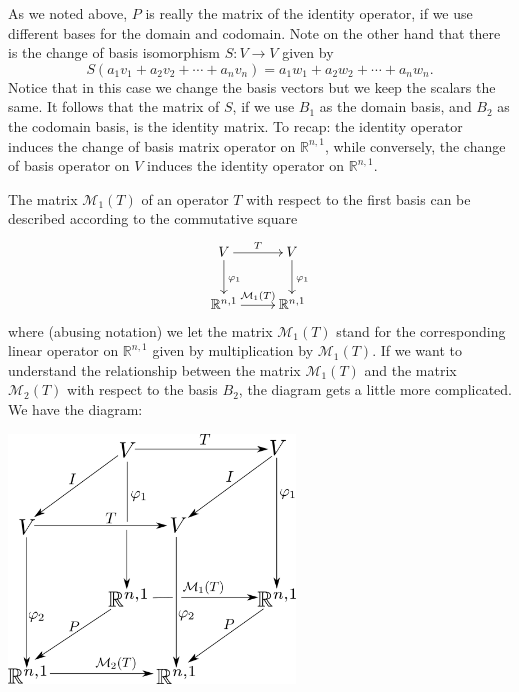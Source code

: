 \documentclass[12pt,letterpaper]{article}
\newcommand{\M}{\mathcal{M}}
\newcommand{\R}{\mathbb{R}}
\begin{document}
As we noted above, $P$ is really the matrix of the identity operator, if we use different bases for the domain and codomain. Note on the other hand that there is the change of basis isomorphism $S:V\to V$ given by
\[
 S(a_1v_1+a_2v_2+\cdots+a_nv_n) = a_1w_1+a_2w_2+\cdots +a_nw_n.
\]
Notice that in this case we change the basis vectors but we keep the scalars the same. It follows that the matrix of $S$, if we use $B_1$ as the domain basis, and $B_2$ as the codomain basis, is the identity matrix. To recap: the identity operator induces the change of basis matrix operator on $\R^{n,1}$, while conversely, the change of basis operator on $V$ induces the identity operator on $\R^{n,1}$.

The matrix $\M_1(T)$ of an operator $T$ with respect to the first basis can be described according to the commutative square
\[
 \xymatrix{V\ar[r]^T \ar[d]^{\varphi_1} & V\ar[d]^{\varphi_1}\\ \R^{n,1}\ar[r]^{\M_1(T)}&\R^{n,1}}
\]
where (abusing notation) we let the matrix $\M_1(T)$ stand for the corresponding linear operator on $\R^{n,1}$ given by multiplication by $\M_1(T)$. If we want to understand the relationship between the matrix $\M_1(T)$ and the matrix $\M_2(T)$ with respect to the basis $B_2$, the diagram gets a little more complicated. We have the diagram:

\begin{center}
 \includegraphics[width=3in]{basis_cube.pdf}
\end{center}
\end{document}
